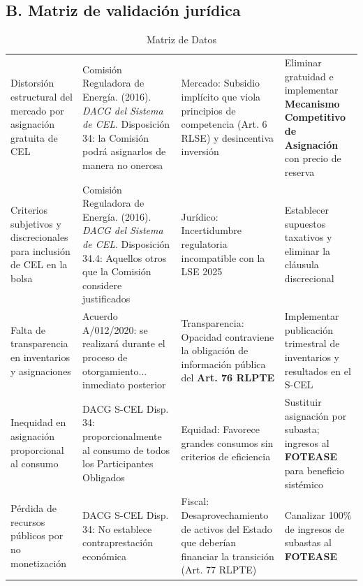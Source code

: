 \documentclass{cel}
\begin{document}
\vspace{0.4cm}
\subsection{B. Matriz de validación jurídica}
\nopagebreak

\vspace{0.3cm}
\begin{tabladoradoLargo}
\renewcommand{\tabularxcolumn}[1]{p{#1}}
\begin{xltabular}{\textwidth}{|X|X|X|X|}
\caption{Matriz de Datos} \\
\toprule
{}  &  &  &  \\
\midrule
\endhead
Distorsión estructural del mercado por asignación gratuita de CEL & Comisión Reguladora de Energía. (2016). \textit{DACG del Sistema de CEL}. Disposición 34: \textquotedbl{}la Comisión podrá asignarlos de manera no onerosa\textquotedbl{} & Mercado: Subsidio implícito que viola principios de competencia (Art. 6 RLSE) y desincentiva inversión & Eliminar gratuidad e implementar \textbf{Mecanismo Competitivo de Asignación} con precio de reserva \\ \hline
Criterios subjetivos y discrecionales para inclusión de CEL en la bolsa & Comisión Reguladora de Energía. (2016). \textit{DACG del Sistema de CEL}. Disposición 34.4: \textquotedbl{}Aquellos otros que la Comisión considere justificados\textquotedbl{} & Jurídico: Incertidumbre regulatoria incompatible con la LSE 2025 & Establecer supuestos taxativos y eliminar la cláusula discrecional \\ \hline
Falta de transparencia en inventarios y asignaciones & Acuerdo A/012/2020: \textquotedbl{}se realizará durante el proceso de otorgamiento... inmediato posterior\textquotedbl{} & Transparencia: Opacidad contraviene la obligación de información pública del \textbf{Art. 76 RLPTE} & Implementar publicación trimestral de inventarios y resultados en el S-CEL \\ \hline
Inequidad en asignación proporcional al consumo & DACG S-CEL Disp. 34: \textquotedbl{}proporcionalmente al consumo de todos los Participantes Obligados\textquotedbl{} & Equidad: Favorece grandes consumos sin criterios de eficiencia & Sustituir asignación por subasta; ingresos al \textbf{FOTEASE} para beneficio sistémico \\ \hline
Pérdida de recursos públicos por no monetización & DACG S-CEL Disp. 34: No establece contraprestación económica & Fiscal: Desaprovechamiento de activos del Estado que deberían financiar la transición (Art. 77 RLPTE) & Canalizar 100\% de ingresos de subastas al \textbf{FOTEASE} \\ \hline
\bottomrule
\end{xltabular}
\end{tabladoradoLargo}
\end{document}
